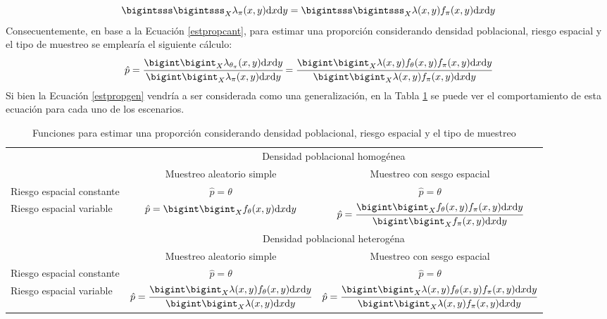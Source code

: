 \begin{equation*}
    \bigintsss\bigintsss_{X} \lambda_\pi(x,y) \mathrm{d}x\mathrm{d}y = \bigintsss\bigintsss_{X} \lambda(x,y) f_{\pi}(x,y)  \mathrm{d}x\mathrm{d}y
\end{equation*}
Consecuentemente, en base a la Ecuación \ref{estpropcant}, para estimar una proporción considerando densidad poblacional, riesgo espacial y el tipo de muestreo se emplearía el siguiente cálculo:
\begin{equation}\label{estpropgen}
    \hat{p} = \cfrac{ \bigint\bigint_{X} \lambda_{\theta_\pi}(x,y) \mathrm{d}x\mathrm{d}y} { \bigint\bigint_{X} \lambda_\pi(x,y)  \mathrm{d}x\mathrm{d}y} = \cfrac{ \bigint\bigint_{X} \lambda(x,y) f_{\theta}(x,y) f_{\pi}(x,y)  \mathrm{d}x\mathrm{d}y} { \bigint\bigint_{X} \lambda(x,y) f_{\pi}(x,y)  \mathrm{d}x\mathrm{d}y}
\end{equation}
Si bien la Ecuación \ref{estpropgen} vendría a ser considerada como una generalización, en la Tabla \ref{esptprofun} se puede ver el comportamiento de esta ecuación para cada uno de los escenarios.

\begin{table}[h]
  \centering
  \caption{Funciones para estimar una proporción considerando densidad poblacional, riesgo espacial y el tipo de muestreo} \label{esptprofun}
    \begin{tabular}{|p{4.645em}|c|c|}
\cmidrule{2-3}    \multicolumn{1}{r|}{} & \multicolumn{2}{p{16em}|}{Densidad poblacional homogénea} \\
\cmidrule{2-3}    \multicolumn{1}{r|}{} & \multicolumn{1}{p{7.785em}|}{Muestreo aleatorio simple} & \multicolumn{1}{p{8.215em}|}{Muestreo con sesgo espacial} \\
    \midrule
    Riesgo espacial constante & $\hat{p} = \theta $ & $\hat{p} = \theta $ \\
    \midrule
    Riesgo espacial variable & $\hat{p} =  \bigint\bigint_{X} f_{\theta}(x,y) \mathrm{d}x\mathrm{d}y $ & $\hat{p} = \cfrac{ \bigint\bigint_{X} f_{\theta}(x,y) f_{\pi}(x,y)  \mathrm{d}x\mathrm{d}y} { \bigint\bigint_{X} f_{\pi}(x,y)  \mathrm{d}x\mathrm{d}y}$ \\
    \midrule
    \multicolumn{1}{r|}{} & \multicolumn{2}{p{16em}|}{Densidad poblacional heterogéna} \\
\cmidrule{2-3}    \multicolumn{1}{r|}{} & \multicolumn{1}{p{7.785em}|}{Muestreo aleatorio simple} & \multicolumn{1}{p{8.215em}|}{Muestreo con sesgo espacial} \\
    \midrule
   Riesgo espacial constante & $\hat{p} = \theta $ & $\hat{p} = \theta $ \\
    \midrule
    Riesgo espacial variable & $\hat{p} = \cfrac{ \bigint\bigint_{X} \lambda(x,y) f_{\theta}(x,y) \mathrm{d}x\mathrm{d}y} { \bigint\bigint_{X} \lambda(x,y) \mathrm{d}x\mathrm{d}y}$ & $\hat{p} = \cfrac{ \bigint\bigint_{X} \lambda(x,y) f_{\theta}(x,y) f_{\pi}(x,y)  \mathrm{d}x\mathrm{d}y} { \bigint\bigint_{X} \lambda(x,y) f_{\pi}(x,y)  \mathrm{d}x\mathrm{d}y}$ \\
    \bottomrule
    \end{tabular}%
\end{table}%

